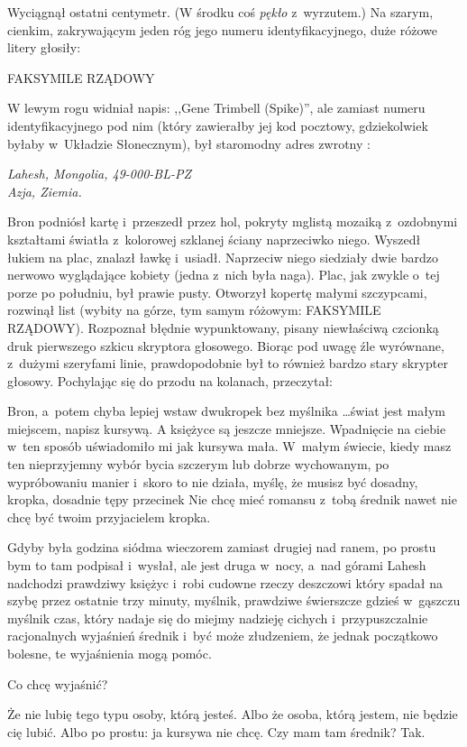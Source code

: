 \documentclass[oneside,polish,11pt,rmheadings]{mwbk}
\begin{document}
  Wyciągnął ostatni centymetr. (W środku coś \textit{pękło } z~wyrzutem.) Na szarym, cienkim, zakrywającym jeden róg jego numeru identyfikacyjnego, duże różowe litery głosiły: 

FAKSYMILE RZĄDOWY 

W lewym rogu widniał napis: ,,Gene Trimbell (Spike)'', ale zamiast numeru identyfikacyjnego pod nim (który zawierałby jej kod pocztowy, gdziekolwiek byłaby w~Układzie Słonecznym), był staromodny adres zwrotny : 

\noindent \textit{ Lahesh, Mongolia, 49-000-BL-PZ \\
Azja, Ziemia. }

Bron podniósł kartę i~przeszedł przez hol, pokryty mglistą mozaiką z~ozdobnymi kształtami światła z~kolorowej szklanej ściany naprzeciwko niego. Wyszedł łukiem na plac, znalazł ławkę i~usiadł. Naprzeciw niego siedziały dwie bardzo nerwowo wyglądające kobiety (jedna z~nich była naga). Plac, jak zwykle o~tej porze po południu, był prawie pusty. Otworzył kopertę małymi szczypcami, rozwinął list (wybity na górze, tym samym różowym: FAKSYMILE RZĄDOWY). Rozpoznał błędnie wypunktowany, pisany niewłaściwą czcionką druk pierwszego szkicu skryptora głosowego. Biorąc pod uwagę źle wyrównane, z~dużymi szeryfami linie, prawdopodobnie był to również bardzo stary skrypter głosowy. Pochylając się do przodu na kolanach, przeczytał: 

Bron, a~potem chyba lepiej wstaw dwukropek bez myślnika \ldots  świat jest małym miejscem, napisz kursywą. A księżyce są jeszcze mniejsze. Wpadnięcie na ciebie w~ten sposób uświadomiło mi jak kursywa mała. W~małym świecie, kiedy masz ten nieprzyjemny wybór bycia szczerym lub dobrze wychowanym, po wypróbowaniu manier i~skoro to nie działa, myślę, że musisz być dosadny, kropka, dosadnie tępy przecinek Nie chcę mieć romansu z~tobą średnik nawet nie chcę być twoim przyjacielem kropka. 

Gdyby była godzina siódma wieczorem zamiast drugiej nad ranem, po prostu bym to tam podpisał i~wysłał, ale jest druga w~nocy, a~nad górami Lahesh nadchodzi prawdziwy księżyc i~robi cudowne rzeczy deszczowi który spadał na szybę przez ostatnie trzy minuty, myślnik, prawdziwe świerszcze gdzieś w~gąszczu myślnik czas, który nadaje się do miejmy nadzieję cichych i~przypuszczalnie racjonalnych wyjaśnień średnik i~być może złudzeniem, że jednak początkowo bolesne, te wyjaśnienia mogą pomóc. 

Co chcę wyjaśnić? 

Że nie lubię tego typu osoby, którą jesteś. Albo że osoba, którą jestem, nie będzie cię lubić. Albo po prostu: ja kursywa nie chcę. Czy mam tam średnik? Tak. 
\end{document}
